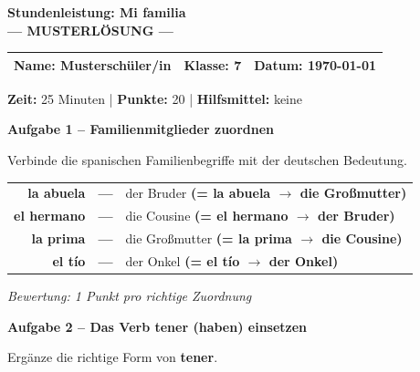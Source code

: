 \documentclass[11pt, a4paper]{article}
\newcommand{\fachfarbe}{spanisch}
\newcommand{\thema}{Stundenleistung: Mi familia}
\newcommand{\klasse}{7}
\newcommand{\maxpunkte}{20}
\newcommand{\zeit}{25 Minuten}
\newcommand{\datum}{\today}
\newcommand{\punktebox}[1]{\hfill\fbox{\small \_/#1}}
\newcommand{\lsg}[1]{\textcolor{loesung}{\textbf{#1}}}
\newenvironment{aufgabe}[1]{%
    \needspace{5\baselineskip}%
    \nopagebreak[4]%
    \vspace{10pt}
    \noindent\textbf{\textcolor{\fachfarbe}{Aufgabe #1}}
    \nopagebreak[4]%
    \vspace{5pt}
    \nopagebreak[4]%
    \begin{list}{}{\leftmargin=0pt}
    \item[]
}{%
    \end{list}
}
\newcommand{\es}[1]{\textcolor{\fachfarbe}{\textbf{#1}}}
\begin{document}
\begin{center}
    {\Large\bfseries\textcolor{\fachfarbe}{\thema}}\\[0.3em]
    {\large\textcolor{loesung}{\textbf{--- MUSTERLÖSUNG ---}}}
\end{center}

\vspace{5pt}

\noindent
\begin{tabularx}{\textwidth}{|X|X|X|}
\hline
\textbf{Name:} \lsg{Musterschüler/in} &
\textbf{Klasse:} \klasse &
\textbf{Datum:} \datum \\
\hline
\end{tabularx}

\vspace{10pt}

\begin{infobox}
\textbf{Zeit:} \zeit{} | \textbf{Punkte:} \maxpunkte{} | \textbf{Hilfsmittel:} keine
\end{infobox}

\vspace{15pt}

\begin{aufgabe}{1 -- Familienmitglieder zuordnen}
Verbinde die spanischen Familienbegriffe mit der deutschen Bedeutung. \punktebox{4}
\end{aufgabe}

\begin{center}
\begin{tabular}{rcl}
\es{la abuela} & \lsg{---} & der Bruder \lsg{(= la abuela $\rightarrow$ die Großmutter)} \\[0.8em]
\es{el hermano} & \lsg{---} & die Cousine \lsg{(= el hermano $\rightarrow$ der Bruder)} \\[0.8em]
\es{la prima} & \lsg{---} & die Großmutter \lsg{(= la prima $\rightarrow$ die Cousine)} \\[0.8em]
\es{el tío} & \lsg{---} & der Onkel \lsg{(= el tío $\rightarrow$ der Onkel)} \\
\end{tabular}
\end{center}

\textit{\textcolor{grau}{Bewertung: 1 Punkt pro richtige Zuordnung}}

\vspace{15pt}

\begin{aufgabe}{2 -- Das Verb \es{tener} (haben) einsetzen}
Ergänze die richtige Form von \es{tener}. \punktebox{4}
\end{aufgabe}
\end{document}
